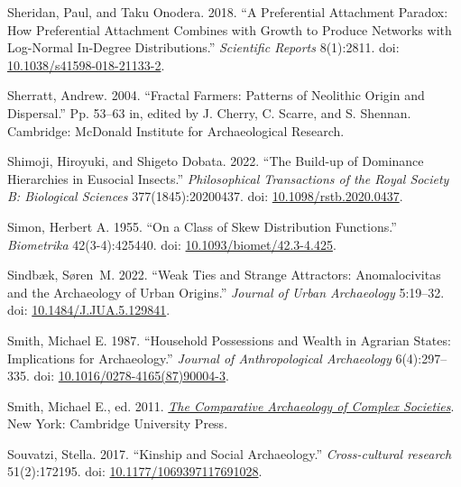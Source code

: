\documentclass[
  12pt,
]{book}
\newlength{\cslhangindent}
\newlength{\cslentryspacingunit} %
\newenvironment{CSLReferences}[2] %
 {%
  \setlength{\parindent}{0pt}
  \ifodd #1
  \let\oldpar\par
  \def\par{\hangindent=\cslhangindent\oldpar}
  \fi
  \setlength{\parskip}{#2\cslentryspacingunit}
 }%
 {}
\begin{document}
\begin{CSLReferences}{1}{0}
\leavevmode{}%
Sheridan, Paul, and Taku Onodera. 2018. {``A Preferential Attachment Paradox: How Preferential Attachment Combines with Growth to Produce Networks with Log-Normal In-Degree Distributions.''} \emph{Scientific Reports} 8(1):2811. doi: \href{https://doi.org/10.1038/s41598-018-21133-2}{10.1038/s41598-018-21133-2}.

\leavevmode{}%
Sherratt, Andrew. 2004. {``Fractal Farmers: Patterns of Neolithic Origin and Dispersal.''} Pp. 53--63 in, edited by J. Cherry, C. Scarre, and S. Shennan. Cambridge: McDonald Institute for Archaeological Research.

\leavevmode{}%
Shimoji, Hiroyuki, and Shigeto Dobata. 2022. {``The Build-up of Dominance Hierarchies in Eusocial Insects.''} \emph{Philosophical Transactions of the Royal Society B: Biological Sciences} 377(1845):20200437. doi: \href{https://doi.org/10.1098/rstb.2020.0437}{10.1098/rstb.2020.0437}.

\leavevmode{}%
Simon, Herbert A. 1955. {``On a Class of Skew Distribution Functions.''} \emph{Biometrika} 42(3-4):425440. doi: \href{https://doi.org/10.1093/biomet/42.3-4.425}{10.1093/biomet/42.3-4.425}.

\leavevmode{}%
Sindbæk, Søren~M. 2022. {``Weak Ties and Strange Attractors: Anomalocivitas and the Archaeology of Urban Origins.''} \emph{Journal of Urban Archaeology} 5:19--32. doi: \href{https://doi.org/10.1484/J.JUA.5.129841}{10.1484/J.JUA.5.129841}.

\leavevmode{}%
Smith, Michael E. 1987. {``Household Possessions and Wealth in Agrarian States: Implications for Archaeology.''} \emph{Journal of Anthropological Archaeology} 6(4):297--335. doi: \href{https://doi.org/10.1016/0278-4165(87)90004-3}{10.1016/0278-4165(87)90004-3}.

\leavevmode{}%
Smith, Michael E., ed. 2011. \emph{\href{https://doi.org/10.1017/CBO9781139022712}{The Comparative Archaeology of Complex Societies}}. New York: Cambridge University Press.

\leavevmode{}%
Souvatzi, Stella. 2017. {``Kinship and Social Archaeology.''} \emph{Cross-cultural research} 51(2):172195. doi: \href{https://doi.org/10.1177/1069397117691028}{10.1177/1069397117691028}.


\end{CSLReferences}
\end{document}

